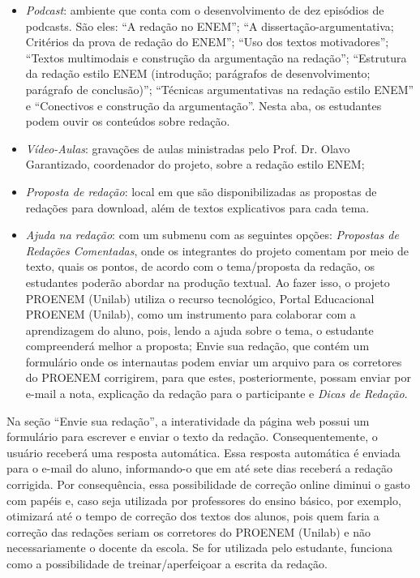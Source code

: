 \documentclass{textolivre}
\begin{document}
\begin{itemize}
\item \emph{Podcast}: ambiente que conta com o desenvolvimento de dez episódios de podcasts. São eles: “A redação no ENEM”; “A dissertação-argumentativa; Critérios da prova de redação do ENEM”; “Uso dos textos motivadores”; “Textos multimodais e construção da argumentação na redação”; “Estrutura da redação estilo ENEM (introdução; parágrafos de desenvolvimento; parágrafo de conclusão)”; “Técnicas argumentativas na redação estilo ENEM” e “Conectivos e construção da argumentação”. Nesta aba, os estudantes podem ouvir os conteúdos sobre redação. 
\item \emph{Vídeo-Aulas}: gravações de aulas ministradas pelo Prof. Dr. Olavo Garantizado, coordenador do projeto, sobre a redação estilo ENEM;
\item \emph{Proposta de redação}: local em que são disponibilizadas as propostas de redações para download, além de textos explicativos para cada tema.
\item \emph{Ajuda na redação}: com um submenu com as seguintes opções: \emph{Propostas de Redações Comentadas}, onde os integrantes do projeto comentam por meio de texto, quais os pontos, de acordo com o tema/proposta da redação, os estudantes poderão abordar na produção textual. Ao fazer isso, o projeto PROENEM (Unilab) utiliza o recurso tecnológico, Portal Educacional PROENEM (Unilab), como um instrumento para colaborar com a aprendizagem do aluno, pois, lendo a ajuda sobre o tema, o estudante compreenderá melhor a proposta; Envie sua redação, que contém um formulário onde os internautas podem enviar um arquivo para os corretores do PROENEM corrigirem, para que estes, posteriormente, possam enviar por e-mail a nota, explicação da redação para o participante e \emph{Dicas de Redação}.
\end{itemize}

Na seção “Envie sua redação”, a interatividade da página web possui um formulário para escrever e enviar o texto da redação. Consequentemente, o usuário receberá uma resposta automática. Essa resposta automática é enviada para o e-mail do aluno, informando-o que em até sete dias receberá a redação corrigida. Por consequência, essa possibilidade de correção online diminui o gasto com papéis e, caso seja utilizada por professores do ensino básico, por exemplo, otimizará até o tempo de correção dos textos dos alunos, pois quem faria a correção das redações seriam os corretores do PROENEM (Unilab) e não necessariamente o docente da escola. Se for utilizada pelo estudante, funciona como a possibilidade de treinar/aperfeiçoar a escrita da redação.
\end{document}
